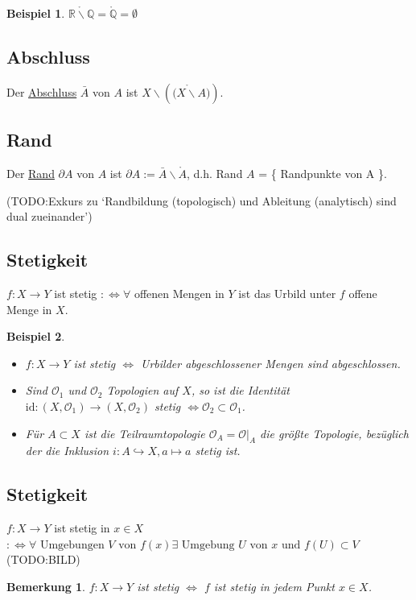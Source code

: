 \documentclass[a4paper,11pt,notitlepage]{report}
\newtheorem{remark}{Bemerkung}[chapter]
\newtheorem{example}{Beispiel}[chapter]
\newcommand{\R}{{\ensuremath{\mathbb{R}}}}
\newcommand{\Q}{{\ensuremath{\mathbb{Q}}}}
\newcommand{\OO}{{\ensuremath{\mathcal{O}}}}
\newenvironment{Kasten}[1]
{
\hspace{0.05\linewidth}
\begin{center}
\begin{minipage}{0.9\linewidth}
\setlength{\fboxsep}{18pt}
\definecolor{shadecolor}{gray}{0.9}
\definecolor{framecolor}{gray}{0}
\def\FrameCommand{\fcolorbox{framecolor}{shadecolor}}
\MakeFramed {\FrameRestore}
\subsection{#1}
\begin{itshape}
}
{
\end{itshape}
\endMakeFramed
\end{minipage}
\end{center}
\vspace{1em}
}
\begin{document}
\begin{example}
	$\mathring {\R \backslash \Q} = \mathring \Q = \emptyset$
\end{example}

\begin{Kasten}{Abschluss}
	Der \underline{Abschluss} $\bar{A}$ von $A$ ist $X \backslash \left ( \mathring {(X \backslash A} ) \right )$.
\end{Kasten}

\begin{Kasten}{Rand}
	Der \underline{Rand} $\partial A$ von $A$ ist $\partial A := \bar{A} \backslash \mathring A$, d.h. Rand $A$ = \{ Randpunkte von A \}.
\end{Kasten}

(TODO:Exkurs zu `Randbildung (topologisch) und Ableitung (analytisch) sind dual zueinander')

\begin{Kasten}{Stetigkeit}
	$f \colon X \rightarrow Y$ ist stetig $:\Leftrightarrow \forall$ offenen Mengen in $Y$ ist das Urbild unter $f$ offene Menge in $X$.
\end{Kasten}

\begin{example}
	\begin{itemize}
		\item $f \colon X \rightarrow Y$ ist stetig $\Leftrightarrow$ Urbilder abgeschlossener Mengen sind abgeschlossen.
		\item Sind $\OO_1$ und $\OO_2$ Topologien auf $X$, so ist die Identität $\text{id} \colon (X,\OO_1) \rightarrow (X,\OO_2)$ stetig $\Leftrightarrow \OO_2 \subset \OO_1$.
		\item Für $A \subset X$ ist die Teilraumtopologie $\OO_A = \OO \big |_A$ die größte Topologie, bezüglich der die Inklusion $i \colon A \hookrightarrow X, a \mapsto a$ stetig ist.
	\end{itemize}
\end{example}

\begin{Kasten}{Stetigkeit}
	$f \colon X \rightarrow Y$ ist stetig in $x \in X$
	$:\Leftrightarrow \forall \text{ Umgebungen } V \text{ von } f(x) \exists \text{ Umgebung } U \text{ von } x \text{ und } f(U) \subset V$
	\newline
	(TODO:BILD)
\end{Kasten}

\begin{remark}
	$f \colon X \rightarrow Y$ ist stetig $\Leftrightarrow$ $f$ ist stetig in jedem Punkt $x \in X$.
\end{remark}
\end{document}
